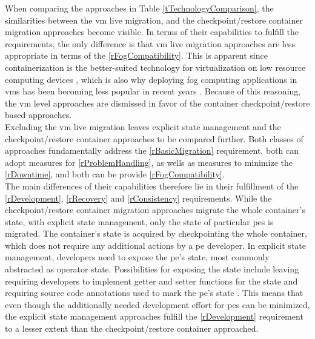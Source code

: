 When comparing the approaches in Table \ref{tTechnologyComparison}, the similarities between the \gls{vm} live migration, and the checkpoint/restore container migration approaches become visible. In terms of their capabilities to fulfill the requirements, the only difference is that \gls{vm} live migration approaches are less appropriate in terms of the \ref{rFogCompatibility}. This is apparent since containerization is the better-suited technology for virtualization on low resource computing devices \cite{Jalali.2016}, which is also why deploying fog computing applications in \gls{vm}s has been becoming less popular in recent years \cite{Puliafito.2018}. Because of this reasoning, the \gls{vm} level approaches are dismissed in favor of the container checkpoint/restore based approaches.\\
Excluding the \gls{vm} live migration leaves explicit state management and the checkpoint/restore container approaches to be compared further. Both classes of approaches fundamentally address the \ref{rBasicMigration} requirement, both can adopt measures for \ref{rProblemHandling}, as wells as measures to minimize the \ref{rDowntime}, and both can be provide \ref{rFogCompatibility}.\\ 
The main differences of their capabilities therefore lie in their fulfillment of the \ref{rDevelopment}, \ref{rRecovery} and \ref{rConsistency} requirements. While the checkpoint/restore container migration approaches migrate the whole container's state, with explicit state management, only the state of particular \gls{pe}s is migrated. The container's state is acquired by checkpointing the whole container, which does not require any additional actions by a \gls{pe} developer. In explicit state management, developers need to expose the \gls{pe}'s state, most commonly abstracted as operator state. Possibilities for exposing the state include leaving requiring developers to implement getter and setter functions for the state \cite{CastroFernandez.2013, Saurez.2016} and requiring source code annotations used to mark the \gls{pe}'s state \cite{Gibson.2014}. This means that even though the additionally needed development effort for \gls{pe}s can be minimized, the explicit state management approaches fulfill the \ref{rDevelopment} requirement to a lesser extent than the checkpoint/restore container approached.\\
